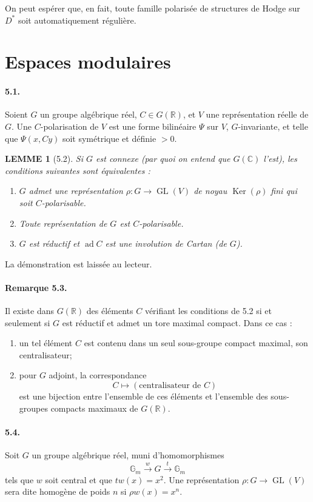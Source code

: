 \documentclass[10pt]{article}
\newcommand{\C}{\mathbb C}
\newcommand{\R}{\mathbb R}
\newcommand{\Ker}{\operatorname{Ker}}
\theoremstyle{deligne}
\newtheorem*{lemme}{LEMME}
\newcommand{\ad}{\operatorname{ad}}
\newcommand{\GL}{\operatorname{GL}}
\begin{document}
On peut espérer que, en fait, toute famille polarisée de structures de Hodge sur $D^*$ soit automatiquement régulière.

\section{Espaces modulaires}

\paragraph{5.1.}
Soient $G$ un groupe algébrique réel, $C\in G(\R)$, et $V$ une représentation réelle de $G$. Une $C$-polarisation de $V$ est une forme bilinéaire $\Psi$ sur $V$, $G$-invariante, et telle que $\Psi(x,Cy)$ soit symétrique et définie $>0$.

\begin{lemme}[5.2]
Si $G$ est connexe (par quoi on entend que $G(\C)$ l'est), les conditions suivantes sont équivalentes :
\begin{enumerate}[label=(\roman*)]
\item $G$ admet une représentation $\rho:G\to \GL(V)$ de noyau $\Ker(\rho)$ fini qui soit $C$-polarisable.
\item Toute représentation de $G$ est $C$-polarisable.
\item $G$ est réductif et $\ad C$ est une involution de Cartan (de $G$).
\end{enumerate}
\end{lemme}

La démonstration est laissée au lecteur.

\paragraph{Remarque 5.3.}
Il existe dans $G(\R)$ des éléments $C$ vérifiant les conditions de 5.2 si et seulement si $G$ est réductif et admet un tore maximal compact. Dans ce cas :
\begin{enumerate}[label=\alph*)]
\item un tel élément $C$ est contenu dans un seul sous-groupe compact maximal, son centralisateur;
\item pour $G$ adjoint, la correspondance
\[
  C\longmapsto (\text{centralisateur de }C)
\]
est une bijection entre l'ensemble de ces éléments et l'ensemble des sous-groupes compacts maximaux de $G(\R)$.
\end{enumerate}

\paragraph{5.4.}
Soit $G$ un groupe algébrique réel, muni d'homomorphismes
\[
\tag{5.4.1}
 \mathbb G_m \xrightarrow{w} G \xrightarrow{t} \mathbb G_m
\]
tels que $w$ soit central et que $tw(x)=x^2$. Une représentation $\rho:G\to\GL(V)$ sera dite homogène de poids $n$ si $\rho w(x)=x^n$.
\end{document}
